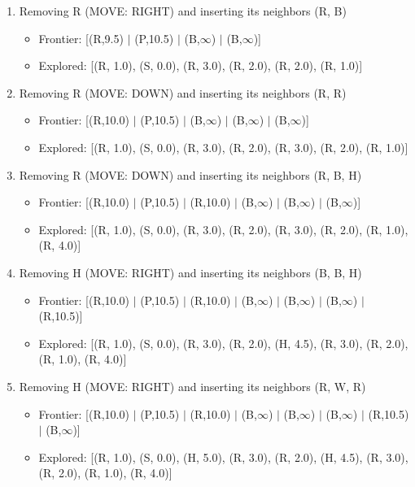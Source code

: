 \documentclass[12pt]{article}
\begin{document}
\begin{enumerate}
\item Removing R (MOVE: RIGHT) and inserting its neighbors (R, B)
\begin{itemize}
\item Frontier: [(R,9.5) \(|\) (P,10.5) \(|\) (B,\(\infty\)) \(|\) (B,\(\infty\))]
\item Explored: [(R, 1.0), (S, 0.0), (R, 3.0), (R, 2.0), (R, 2.0), (R, 1.0)]
\end{itemize}

\item Removing R (MOVE: DOWN) and inserting its neighbors (R, R)
\begin{itemize}
\item Frontier: [(R,10.0) \(|\) (P,10.5) \(|\) (B,\(\infty\)) \(|\) (B,\(\infty\)) \(|\) (B,\(\infty\))]
\item Explored: [(R, 1.0), (S, 0.0), (R, 3.0), (R, 2.0), (R, 3.0), (R, 2.0), (R, 1.0)]
\end{itemize}

\item Removing R (MOVE: DOWN) and inserting its neighbors (R, B, H)
\begin{itemize}
\item Frontier: [(R,10.0) \(|\) (P,10.5) \(|\) (R,10.0) \(|\) (B,\(\infty\)) \(|\) (B,\(\infty\)) \(|\) (B,\(\infty\))]
\item Explored: [(R, 1.0), (S, 0.0), (R, 3.0), (R, 2.0), (R, 3.0), (R, 2.0), (R, 1.0), (R, 4.0)]
\end{itemize}

\item Removing H (MOVE: RIGHT) and inserting its neighbors (B, B, H)
\begin{itemize}
\item Frontier: [(R,10.0) \(|\) (P,10.5) \(|\) (R,10.0) \(|\) (B,\(\infty\)) \(|\) (B,\(\infty\)) \(|\) (B,\(\infty\)) \(|\) (R,10.5)]
\item Explored: [(R, 1.0), (S, 0.0), (R, 3.0), (R, 2.0), (H, 4.5), (R, 3.0), (R, 2.0), (R, 1.0), (R, 4.0)]
\end{itemize}

\item Removing H (MOVE: RIGHT) and inserting its neighbors (R, W, R)
\begin{itemize}
\item Frontier: [(R,10.0) \(|\) (P,10.5) \(|\) (R,10.0) \(|\) (B,\(\infty\)) \(|\) (B,\(\infty\)) \(|\) (B,\(\infty\)) \(|\) (R,10.5) \(|\) (B,\(\infty\))]
\item Explored: [(R, 1.0), (S, 0.0), (H, 5.0), (R, 3.0), (R, 2.0), (H, 4.5), (R, 3.0), (R, 2.0), (R, 1.0), (R, 4.0)]
\end{itemize}


\end{enumerate}
\end{document}
